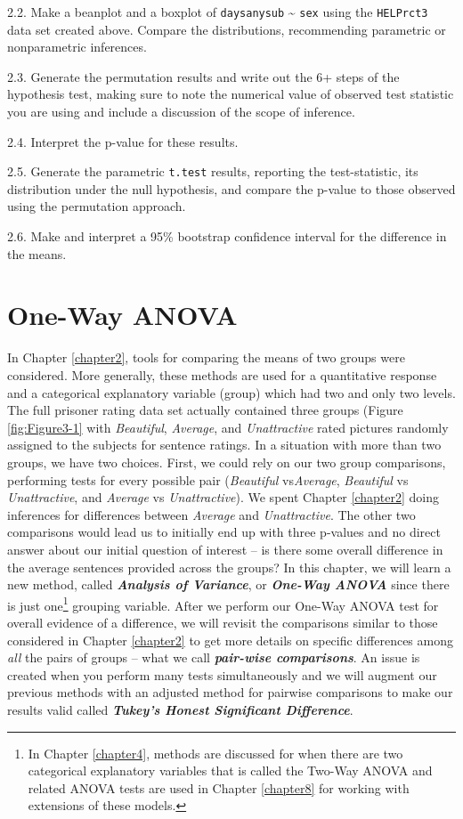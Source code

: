 \documentclass[]{book}
\let\rmarkdownfootnote\footnote%
\def\footnote{\protect\rmarkdownfootnote}
\begin{document}
2.2. Make a beanplot and a boxplot of \texttt{daysanysub}
\textasciitilde{} \texttt{sex} using the \texttt{HELPrct3} data set
created above. Compare the distributions, recommending parametric or
nonparametric inferences.

2.3. Generate the permutation results and write out the 6+ steps of the
hypothesis test, making sure to note the numerical value of observed
test statistic you are using and include a discussion of the scope of
inference.

2.4. Interpret the p-value for these results.

2.5. Generate the parametric \texttt{t.test} results, reporting the
test-statistic, its distribution under the null hypothesis, and compare
the p-value to those observed using the permutation approach.

2.6. Make and interpret a 95\% bootstrap confidence interval for the
difference in the means.

\chapter{One-Way ANOVA}\label{chapter3}

In Chapter \ref{chapter2}, tools for comparing the means of two groups
were considered. More generally, these methods are used for a
quantitative response and a categorical explanatory variable (group)
which had two and only two levels. The full prisoner rating data set
actually contained three groups (Figure \ref{fig:Figure3-1} with
\emph{Beautiful}, \emph{Average}, and \emph{Unattractive} rated pictures
randomly assigned to the subjects for sentence ratings. In a situation
with more than two groups, we have two choices. First, we could rely on
our two group comparisons, performing tests for every possible pair
(\emph{Beautiful} vs\emph{Average}, \emph{Beautiful} vs
\emph{Unattractive}, and \emph{Average} vs \emph{Unattractive}). We
spent Chapter \ref{chapter2} doing inferences for differences between
\emph{Average} and \emph{Unattractive}. The other two comparisons would
lead us to initially end up with three p-values and no direct answer
about our initial question of interest -- is there some overall
difference in the average sentences provided across the groups? In this
chapter, we will learn a new method, called \textbf{\emph{Analysis of
Variance}}, or \textbf{\emph{One-Way ANOVA}} since there is just
one\footnote{In Chapter \ref{chapter4}, methods are discussed for when
  there are two categorical explanatory variables that is called the
  Two-Way ANOVA and related ANOVA tests are used in Chapter
  \ref{chapter8} for working with extensions of these models.} grouping
variable. After we perform our One-Way ANOVA test for overall evidence
of a difference, we will revisit the comparisons similar to those
considered in Chapter \ref{chapter2} to get more details on specific
differences among \emph{all} the pairs of groups -- what we call
\textbf{\emph{pair-wise comparisons}}. An issue is created when you
perform many tests simultaneously and we will augment our previous
methods with an adjusted method for pairwise comparisons to make our
results valid called \textbf{\emph{Tukey's Honest Significant
Difference}}.
\end{document}
